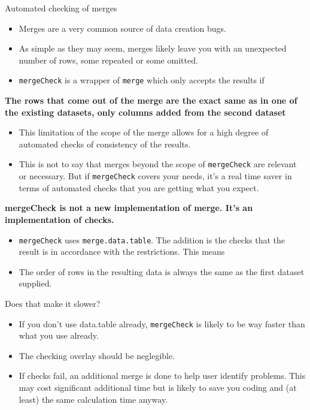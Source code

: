 \documentclass[
  8pt,
  ignorenonframetext,
  aspectratio=169]{beamer}
\providecommand{\tightlist}{%
  \setlength{\itemsep}{0pt}\setlength{\parskip}{0pt}}
\begin{document}
\begin{frame}[fragile]{Automated checking of merges}
\protect\hypertarget{automated-checking-of-merges}{}
\begin{itemize}
\tightlist
\item
  Merges are a very common source of data creation bugs.
\item
  As simple as they may seem, merges likely leave you with an unexpected
  number of rows, some repeated or some omitted.
\item
  \texttt{mergeCheck} is a wrapper of \texttt{merge} which only accepts
  the results if
\end{itemize}

\textbf{The rows that come out of the merge are the exact same as in one
of the existing datasets, only columns added from the second dataset}

\begin{itemize}
\item
  This limitation of the scope of the merge allows for a high degree of
  automated checks of consistency of the results.
\item
  This is not to say that merges beyond the scope of \texttt{mergeCheck}
  are relevant or necessary. But if \texttt{mergeCheck} covers your
  needs, it's a real time saver in terms of automated checks that you
  are getting what you expect.
\end{itemize}

\textbf{mergeCheck is not a new implementation of merge. It's an
implementation of checks.}

\begin{itemize}
\item
  \texttt{mergeCheck} uses \texttt{merge.data.table}. The addition is
  the checks that the result is in accordance with the restrictions.
  This means
\item
  The order of rows in the resulting data is always the same as the
  first dataset supplied.
\end{itemize}

Does that make it slower?

\begin{itemize}
\tightlist
\item
  If you don't use data.table already, \texttt{mergeCheck} is likely to
  be way faster than what you use already.
\item
  The checking overlay should be neglegible.
\item
  If checks fail, an additional merge is done to help user identify
  problems. This may cost significant additional time but is likely to
  save you coding and (at least) the same calculation time anyway.
\end{itemize}
\end{frame}
\end{document}
